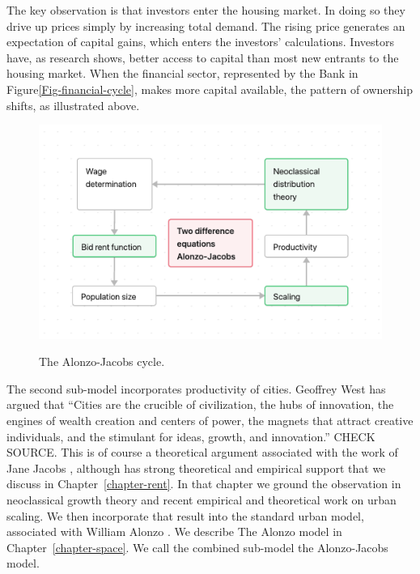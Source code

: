 The key observation is that investors enter the housing market. In doing so they drive up prices simply by increasing total demand. The rising price generates an expectation of capital gains, which enters the investors' calculations. Investors have, as research shows, better access to capital than most new entrants to the housing market. When the financial sector, represented by the Bank in Figure\ref{Fig-financial-cycle}, makes more capital available, the pattern of ownership shifts, as illustrated above.

\begin{figure}[h!]
    \centering
    \includegraphics[scale=.7]{fig/flow_Alonzo-Jacobs_cycle.png}
    \label{Fig-Alonzo-jJacobs-cycle}
\caption{The Alonzo-Jacobs cycle.}
\end{figure}

The second sub-model incorporates  productivity of cities. Geoffrey West has argued that ``Cities are the crucible of civilization, the hubs of innovation, the engines of wealth creation and centers of power, the magnets that attract creative individuals, and the stimulant for ideas, growth, and innovation.'' \cite{westScaleUniversalLaws2017} CHECK SOURCE. This is of course a theoretical argument associated with the work of Jane Jacobs \cite{jacobsEconomyCities1969a}, although has strong theoretical and empirical support  \cite{bettencourtGrowthInnovationScaling2007, bettencourtOriginsScalingCities2013, dongUnderstandingMesoscopicScaling2020, loboUrbanScalingProduction2013} that we discuss in Chapter~\ref{chapter-rent}. In that chapter we ground the observation in  \gls{neoclassical growth theory} and recent empirical and theoretical work on \gls{urban scaling}. We then  incorporate that result into the standard urban model,  associated with William Alonzo \cite{alonzoTheoryUrbanLand1960}.   We describe The Alonzo model in Chapter~\ref{chapter-space}. We call the combined sub-model the \gls{Alonzo-Jacobs model}.   


